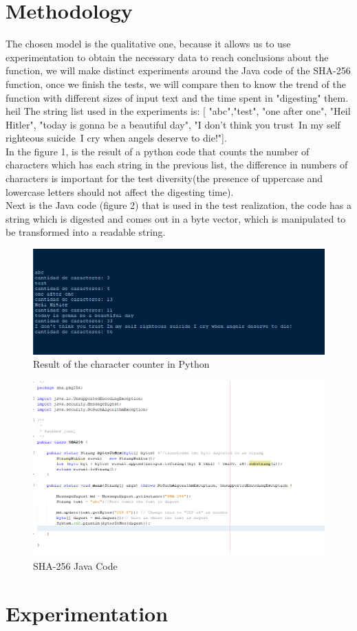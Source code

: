 \documentclass[journal]{IEEEtran}
\begin{document}
\section{Methodology}
The chosen model is the qualitative one, because it allows us to use experimentation to obtain the necessary data to reach conclusions about the function, we will make distinct experiments around the Java code of the SHA-256 function, once we finish the tests, we will compare then to know the trend of the function with different sizes of input text and the time spent in "digesting" them.\\heil 
The string list used in the experiments is:
[ "abc","test", "one after one", "Heil Hitler", "today is gonna be a beautiful day", "I don't think you trust\ In my self righteous suicide\ I cry when angels deserve to die!"].\\
In the figure 1, is the result of a python code that counts the number of characters which has each string in the previous list, the difference in numbers of characters is important for the test diversity(the presence of uppercase and lowercase letters should not affect the digesting time). \\
 Next is the Java code (figure 2) that is used in the test realization, the code has a string which is digested and comes out in a byte vector, which is manipulated to be transformed into a readable string.
\begin{figure}[h] 
	\centering \includegraphics[width=.70\columnwidth]{CantidadDeCaracteres.png}
	\caption{
		\label{fig:samplesetup}
		Result of the character counter in Python
	}
\end{figure}
\begin{figure}[h] 
	\centering \includegraphics[width=.70\columnwidth]{Sha-256Code.png}
	\caption{
		\label{fig:samplesetup}
		SHA-256 Java Code 
	}
\end{figure}
\section{Experimentation}
\end{document}
